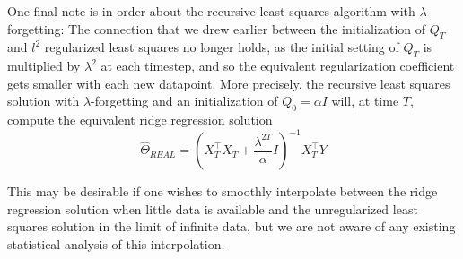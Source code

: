 One final note is in order about the recursive least squares algorithm with
$\lambda$-forgetting: The connection that we drew earlier between the
initialization of $Q_T$ and $l^2$ regularized least squares no longer holds, as
the initial setting of $Q_T$ is multiplied by $\lambda^2$ at each timestep, and so
the equivalent regularization coefficient gets smaller with each new
datapoint. More precisely, the recursive least squares solution with
$\lambda$-forgetting and an initialization of $Q_0 = \alpha I$ will, at time
$T$, compute the equivalent ridge regression solution
\begin{equation}
  \hat\Theta_{REAL} = (X_T^\top X_T + \frac{\lambda^{2T}}{\alpha}I)^{-1}X_T^\top Y
\end{equation}

This may be desirable if one wishes to smoothly interpolate between
the ridge regression solution when little data is available and the
unregularized least squares solution in the limit of infinite data, but we are
not aware of any existing statistical analysis of this interpolation.
